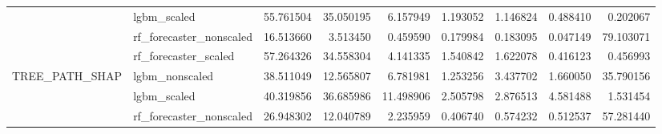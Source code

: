 \begin{table}
\begin{tabular}{llrrrrrrr}
 & lgbm\_scaled & {\cellcolor[HTML]{B40426}} \color[HTML]{F1F1F1} 55.761504 & {\cellcolor[HTML]{F5C4AC}} \color[HTML]{000000} 35.050195 & {\cellcolor[HTML]{5B7AE5}} \color[HTML]{F1F1F1} 6.157949 & {\cellcolor[HTML]{3F53C6}} \color[HTML]{F1F1F1} 1.193052 & {\cellcolor[HTML]{3F53C6}} \color[HTML]{F1F1F1} 1.146824 & {\cellcolor[HTML]{3C4EC2}} \color[HTML]{F1F1F1} 0.488410 & {\cellcolor[HTML]{3B4CC0}} \color[HTML]{F1F1F1} 0.202067 \\
 & rf\_forecaster\_nonscaled & {\cellcolor[HTML]{7EA1FA}} \color[HTML]{F1F1F1} 16.513660 & {\cellcolor[HTML]{485FD1}} \color[HTML]{F1F1F1} 3.513450 & {\cellcolor[HTML]{3C4EC2}} \color[HTML]{F1F1F1} 0.459590 & {\cellcolor[HTML]{3B4CC0}} \color[HTML]{F1F1F1} 0.179984 & {\cellcolor[HTML]{3B4CC0}} \color[HTML]{F1F1F1} 0.183095 & {\cellcolor[HTML]{3B4CC0}} \color[HTML]{F1F1F1} 0.047149 & {\cellcolor[HTML]{B40426}} \color[HTML]{F1F1F1} 79.103071 \\
 & rf\_forecaster\_scaled & {\cellcolor[HTML]{B40426}} \color[HTML]{F1F1F1} 57.264326 & {\cellcolor[HTML]{F2CBB7}} \color[HTML]{000000} 34.558304 & {\cellcolor[HTML]{4E68D8}} \color[HTML]{F1F1F1} 4.141335 & {\cellcolor[HTML]{4055C8}} \color[HTML]{F1F1F1} 1.540842 & {\cellcolor[HTML]{4055C8}} \color[HTML]{F1F1F1} 1.622078 & {\cellcolor[HTML]{3B4CC0}} \color[HTML]{F1F1F1} 0.416123 & {\cellcolor[HTML]{3B4CC0}} \color[HTML]{F1F1F1} 0.456993 \\
\cline{1-9}
\multirow[c]{4}{*}{TREE\_PATH\_SHAP} & lgbm\_nonscaled & {\cellcolor[HTML]{B40426}} \color[HTML]{F1F1F1} 38.511049 & {\cellcolor[HTML]{9FBFFF}} \color[HTML]{000000} 12.565807 & {\cellcolor[HTML]{688AEF}} \color[HTML]{F1F1F1} 6.781981 & {\cellcolor[HTML]{3B4CC0}} \color[HTML]{F1F1F1} 1.253256 & {\cellcolor[HTML]{4C66D6}} \color[HTML]{F1F1F1} 3.437702 & {\cellcolor[HTML]{3D50C3}} \color[HTML]{F1F1F1} 1.660050 & {\cellcolor[HTML]{CD423B}} \color[HTML]{F1F1F1} 35.790156 \\
 & lgbm\_scaled & {\cellcolor[HTML]{B40426}} \color[HTML]{F1F1F1} 40.319856 & {\cellcolor[HTML]{D44E41}} \color[HTML]{F1F1F1} 36.685986 & {\cellcolor[HTML]{8FB1FE}} \color[HTML]{000000} 11.498906 & {\cellcolor[HTML]{4257C9}} \color[HTML]{F1F1F1} 2.505798 & {\cellcolor[HTML]{445ACC}} \color[HTML]{F1F1F1} 2.876513 & {\cellcolor[HTML]{536EDD}} \color[HTML]{F1F1F1} 4.581488 & {\cellcolor[HTML]{3B4CC0}} \color[HTML]{F1F1F1} 1.531454 \\
 & rf\_forecaster\_nonscaled & {\cellcolor[HTML]{D4DBE6}} \color[HTML]{000000} 26.948302 & {\cellcolor[HTML]{7DA0F9}} \color[HTML]{F1F1F1} 12.040789 & {\cellcolor[HTML]{445ACC}} \color[HTML]{F1F1F1} 2.235959 & {\cellcolor[HTML]{3B4CC0}} \color[HTML]{F1F1F1} 0.406740 & {\cellcolor[HTML]{3B4CC0}} \color[HTML]{F1F1F1} 0.574232 & {\cellcolor[HTML]{3B4CC0}} \color[HTML]{F1F1F1} 0.512537 & {\cellcolor[HTML]{B40426}} \color[HTML]{F1F1F1} 57.281440 \\

\end{tabular}
\end{table}
